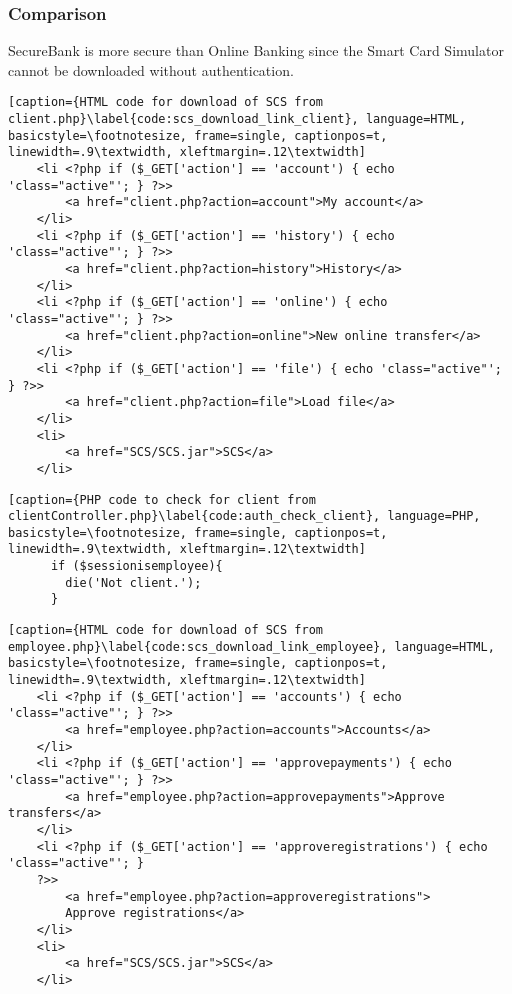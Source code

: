 \subsubsection{Comparison}
SecureBank is more secure than Online Banking since the Smart Card Simulator cannot be downloaded without authentication.

\begin{lstlisting}[caption={HTML code for download of SCS from client.php}\label{code:scs_download_link_client}, language=HTML, basicstyle=\footnotesize, frame=single, captionpos=t, linewidth=.9\textwidth, xleftmargin=.12\textwidth]
    <li <?php if ($_GET['action'] == 'account') { echo 'class="active"'; } ?>>
        <a href="client.php?action=account">My account</a>
    </li>
    <li <?php if ($_GET['action'] == 'history') { echo 'class="active"'; } ?>>
        <a href="client.php?action=history">History</a>
    </li>
    <li <?php if ($_GET['action'] == 'online') { echo 'class="active"'; } ?>>
        <a href="client.php?action=online">New online transfer</a>
    </li>
    <li <?php if ($_GET['action'] == 'file') { echo 'class="active"'; } ?>>
        <a href="client.php?action=file">Load file</a>
    </li>
    <li>
        <a href="SCS/SCS.jar">SCS</a>
    </li>
\end{lstlisting}

\begin{lstlisting}[caption={PHP code to check for client from clientController.php}\label{code:auth_check_client}, language=PHP, basicstyle=\footnotesize, frame=single, captionpos=t, linewidth=.9\textwidth, xleftmargin=.12\textwidth]
      if ($sessionisemployee){
        die('Not client.');
      }
\end{lstlisting}

\begin{lstlisting}[caption={HTML code for download of SCS from employee.php}\label{code:scs_download_link_employee}, language=HTML, basicstyle=\footnotesize, frame=single, captionpos=t, linewidth=.9\textwidth, xleftmargin=.12\textwidth]
    <li <?php if ($_GET['action'] == 'accounts') { echo 'class="active"'; } ?>>
        <a href="employee.php?action=accounts">Accounts</a>
    </li>
    <li <?php if ($_GET['action'] == 'approvepayments') { echo 'class="active"'; } ?>>
        <a href="employee.php?action=approvepayments">Approve transfers</a>
    </li>
    <li <?php if ($_GET['action'] == 'approveregistrations') { echo 'class="active"'; }
    ?>>
        <a href="employee.php?action=approveregistrations">
        Approve registrations</a>
    </li>
    <li>
        <a href="SCS/SCS.jar">SCS</a>
    </li>
\end{lstlisting}

